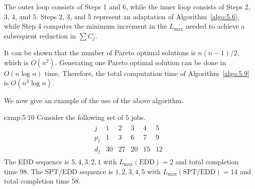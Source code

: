 The outer loop consists of Steps 1 and 6, while the inner loop consists of 
Steps 2, 3, 4, and 5. Steps 2, 3, and 5 represent an adaptation of 
Algorithm~\ref{algo:5.6}, while Step 4 computes the minimum increment 
in the $L_{\max}$ needed to achieve a subsequent reduction in $\sum C_j$. 

It can be shown that the number of Pareto optimal solutions is $n(n-1)/2$, 
which is $O(n^2)$. Generating one Pareto optimal solution can be done in 
$O(n\log n)$ time. Therefore, the total computation time of 
Algorithm~\ref{algo:5.9} is $O(n^3\log n)$. 

We now give an example of the use of the above algorithm. 

\begin{exmp}{exmp:5.10}
    Consider the following set of $5$ jobs. 
    \begin{align*}
        \begin{array}{c|ccccc}
            j & 1 & 2 & 3 & 4 & 5 \\ \hline 
            p_j & 1 & 3 & 6 & 7 & 9 \\ 
            d_j & 30 & 27 & 20 & 15 & 12
        \end{array}
    \end{align*}
    The EDD sequence is $5, 4, 3, 2, 1$ with $L_{\max}(\text{EDD}) = 2$ 
    and total completion time $98$. The SPT/EDD sequence is $1, 2, 3, 4, 5$ with 
    $L_{\max}(\text{SPT/EDD}) = 14$ and total completion time $58$. 


\end{exmp}
